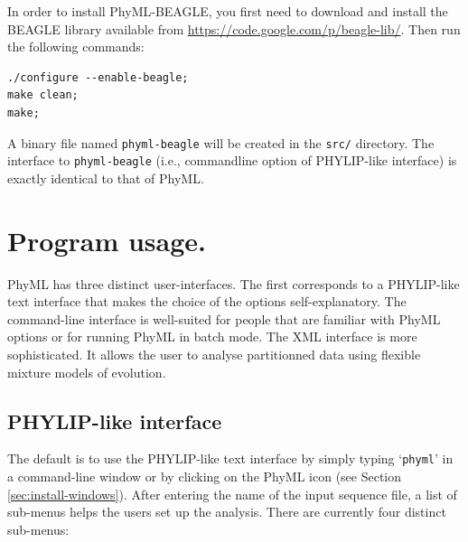 \documentclass[a4paper,12pt]{article}
\newcommand{\x}[1]{\texttt{#1}}
\begin{document}
In  order to  install  PhyML-BEAGLE, you  first  need to  download and  install  the BEAGLE  library
available from \url{https://code.google.com/p/beagle-lib/}.  Then run the following commands:

{\setlength{\baselineskip}{0.5\baselineskip}
\begin{verbatim}
./configure --enable-beagle;
make clean;
make;
\end{verbatim} } A binary file named \x{phyml-beagle} will be created in the \x{src/} directory. The
interface  to  \x{phyml-beagle} (i.e.,  commandline  option  of  PHYLIP-like interface)  is  exactly
identical to that of PhyML.

\section{Program usage.}\label{sec:phyml_new}

PhyML has  three distinct user-interfaces.   The first corresponds  to a PHYLIP-like  text interface
that makes the choice of the options self-explanatory. The command-line interface is well-suited for
people that are familiar with PhyML options or for running PhyML in batch mode. The XML interface is
more sophisticated. It allows the user to analyse partitionned data using flexible mixture models of evolution.

\subsection{PHYLIP-like interface}

The default is to use the PHYLIP-like  text interface by simply typing `\x{phyml}' in a command-line
window or by clicking on the PhyML icon (see Section \ref{sec:install-windows}).  After entering the
name of the input sequence file, a list of  sub-menus helps the users set up the analysis.  There
are currently four distinct sub-menus:

\end{document}
